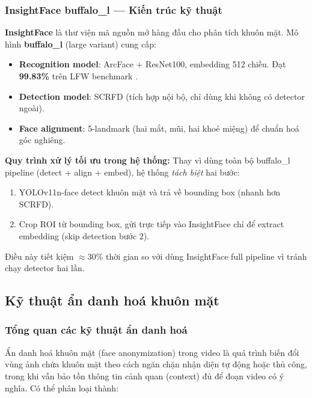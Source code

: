\subsubsection{InsightFace buffalo\_l --- Kiến trúc kỹ thuật}
\label{subsubsec:insightface}

\textbf{InsightFace} \cite{guo2021insightface} là thư viện mã nguồn mở hàng đầu cho phân tích khuôn mặt. Mô hình \textbf{buffalo\_l} (large variant) cung cấp:

\begin{itemize}
    \item \textbf{Recognition model}: ArcFace + ResNet100, embedding 512 chiều. Đạt \textbf{99.83\%} trên LFW benchmark \cite{lfw2007}.
    \item \textbf{Detection model}: SCRFD (tích hợp nội bộ, chỉ dùng khi không có detector ngoài).
    \item \textbf{Face alignment}: 5-landmark (hai mắt, mũi, hai khoé miệng) để chuẩn hoá góc nghiêng.
\end{itemize}

\medskip
\textbf{Quy trình xử lý tối ưu trong hệ thống:} Thay vì dùng toàn bộ buffalo\_l pipeline (detect + align + embed), hệ thống \textit{tách biệt} hai bước:
\begin{enumerate}[1.]
    \item YOLOv11n-face detect khuôn mặt và trả về bounding box (nhanh hơn SCRFD).
    \item Crop ROI từ bounding box, gửi trực tiếp vào InsightFace chỉ để extract embedding (skip detection bước 2).
\end{enumerate}
Điều này tiết kiệm $\approx 30\%$ thời gian so với dùng InsightFace full pipeline vì tránh chạy detector hai lần.

\subsection{Kỹ thuật ẩn danh hoá khuôn mặt}
\label{subsec:anondanh}

\subsubsection{Tổng quan các kỹ thuật ẩn danh hoá}
\label{subsubsec:anon_overview}

Ẩn danh hoá khuôn mặt (face anonymization) trong video là quá trình biến đổi vùng ảnh chứa khuôn mặt theo cách ngăn chặn nhận diện tự động hoặc thủ công, trong khi vẫn bảo tồn thông tin cảnh quan (context) đủ để đoạn video có ý nghĩa. Có thể phân loại thành:

